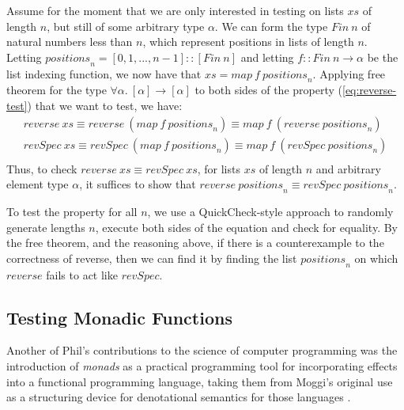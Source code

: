 \documentclass{llncs}
\begin{document}
Assume for the moment that we are only interested in testing on lists
$\mathit{xs}$ of length $n$, but still of some arbitrary type
$\alpha$. We can form the type $\mathit{Fin}~n$ of natural numbers
less than $n$, which represent positions in lists of length
$n$. Letting
$\mathit{positions}_n = [0, 1, ..., n-1] :: [\mathit{Fin}~n]$ and
letting $f :: \mathit{Fin}~n \to \alpha$ be the list indexing
function, we now have that
$\mathit{xs} = \mathit{map}~f~\mathit{positions}_n$. Applying free
theorem for the type $\forall \alpha.~[\alpha] \to [\alpha]$ to both
sides of the property (\ref{eq:reverse-test}) that we want to test, we
have:
\begin{displaymath}
  \begin{array}{l}
    \mathit{reverse}~\mathit{xs} \equiv \mathit{reverse}~(\mathit{map}~f~\mathit{positions}_n) \equiv \mathit{map}~f~(\mathit{reverse}~\mathit{positions}_n) \\
    \mathit{revSpec}~\mathit{xs} \equiv \mathit{revSpec}~(\mathit{map}~f~\mathit{positions}_n) \equiv \mathit{map}~f~(\mathit{revSpec}~\mathit{positions}_n) \\
  \end{array}
\end{displaymath}
Thus, to check
$\mathit{reverse}~\mathit{xs} \equiv \mathit{revSpec}~\mathit{xs}$,
for lists $\mathit{xs}$ of length $n$ and arbitrary element type
$\alpha$, it suffices to show that
$\mathit{reverse}~\mathit{positions}_n \equiv
\mathit{revSpec}~\mathit{positions}_n$.

To test the property for all $n$, we use a QuickCheck-style approach
to randomly generate lengths $n$, execute both sides of the equation
and check for equality. By the free theorem, and the reasoning above,
if there is a counterexample to the correctness of reverse, then we
can find it by finding the list $\mathit{positions}_n$ on which
$\mathit{reverse}$ fails to act like $\mathit{revSpec}$.

\subsection{Testing Monadic Functions}

Another of Phil's contributions to the science of computer programming
was the introduction of \emph{monads} as a practical programming tool
for incorporating effects into a functional programming language,
taking them from Moggi's original use as a structuring device for
denotational semantics for those languages
\cite{DBLP:conf/lics/Moggi89}.
\end{document}
